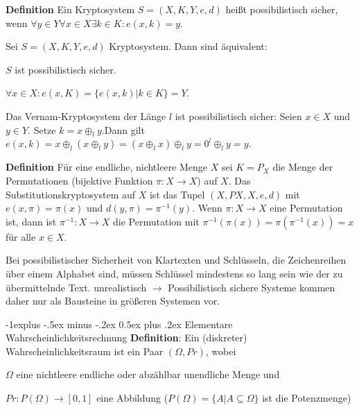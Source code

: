 \documentclass[a4paper]{article}
\makeatletter
\renewcommand{\subsection}{\@startsection{subsection}{2}{0mm}%
 {-1explus -.5ex minus -.2ex}%
 {0.5ex plus .2ex}%
 {\normalfont\normalsize\bfseries}}
\makeatother
\begin{document}
\begin{multicols}{3}
    \textbf{Definition} Ein Kryptosystem $S=(X,K,Y,e,d)$ heißt possibilistisch sicher, wenn $\forall y\in Y\forall x\in X\exists k\in K:e(x,k)=y$.

    \begin{enumerate*}
        \item Sei $S=(X,K,Y,e,d)$ Kryptosystem. Dann sind äquivalent:
        \begin{itemize*}
            \item $S$ ist possibilistisch sicher.
            \item $\forall x\in X:e(x,K)=\{e(x,k)|k\in K\}=Y$.
        \end{itemize*}
        \item Das Vernam-Kryptosystem der Länge $l$ ist possibilistisch sicher: Seien $x\in X$ und $y\in Y$. Setze $k=x\oplus_l y$.Dann gilt $e(x,k)=x\oplus_l(x\oplus_l y)=(x\oplus_l x)\oplus_l y= 0^l\oplus_l y=y$.
    \end{enumerate*}

    \textbf{Definition} Für eine endliche, nichtleere Menge $X$ sei $K=P_X$ die Menge der Permutationen (bijektive Funktion $\pi:X\rightarrow X$) auf $X$. Das Substitutionskryptosystem auf $X$ ist das Tupel $(X,PX,X,e,d)$ mit $e(x,\pi)=\pi(x)$ und $d(y,\pi)=\pi^{-1} (y)$.
    Wenn $\pi:X\rightarrow X$ eine Permutation ist, dann ist $\pi^{-1}:X\rightarrow X$ die Permutation mit $\pi^{-1}(\pi(x))=\pi(\pi^{-1}(x)) =x$ für alle $x\in X$.

    Bei possibilistischer Sicherheit von Klartexten und Schlüsseln, die Zeichenreihen über einem Alphabet sind, müssen Schlüssel mindestens so lang sein wie der zu übermittelnde Text. unrealistisch $\rightarrow$ Possibilistisch sichere Systeme kommen daher nur als Bausteine in größeren Systemen vor.

    \subsection{Elementare Wahrscheinlichkeitsrechnung}
    \textbf{Definition}: Ein (diskreter) Wahrscheinlichkeitsraum ist ein Paar $(\Omega,Pr)$, wobei
    \begin{itemize*}
        \item $\Omega$ eine nichtleere endliche oder abzählbar unendliche Menge und
        \item $Pr:P(\Omega)\rightarrow[0,1]$ eine Abbildung ($P(\Omega)=\{A|A\subseteq\Omega\}$ ist die Potenzmenge)
    \end{itemize*}


\end{multicols}
\end{document}
